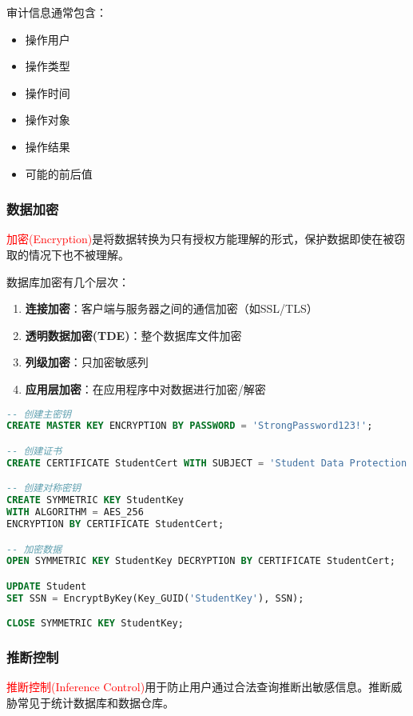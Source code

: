 \documentclass{../../note}
\begin{document}
审计信息通常包含：
\begin{itemize}
    \item 操作用户
    \item 操作类型
    \item 操作时间
    \item 操作对象
    \item 操作结果
    \item 可能的前后值
\end{itemize}

\subsubsection{数据加密}
\textcolor{red}{加密(Encryption)}是将数据转换为只有授权方能理解的形式，保护数据即使在被窃取的情况下也不被理解。

数据库加密有几个层次：
\begin{enumerate}
    \item \textbf{连接加密}：客户端与服务器之间的通信加密（如SSL/TLS）
    \item \textbf{透明数据加密(TDE)}：整个数据库文件加密
    \item \textbf{列级加密}：只加密敏感列
    \item \textbf{应用层加密}：在应用程序中对数据进行加密/解密
\end{enumerate}

\begin{lstlisting}[language=SQL, caption=SQL Server中的列加密示例]
-- 创建主密钥
CREATE MASTER KEY ENCRYPTION BY PASSWORD = 'StrongPassword123!';

-- 创建证书
CREATE CERTIFICATE StudentCert WITH SUBJECT = 'Student Data Protection';

-- 创建对称密钥
CREATE SYMMETRIC KEY StudentKey
WITH ALGORITHM = AES_256
ENCRYPTION BY CERTIFICATE StudentCert;

-- 加密数据
OPEN SYMMETRIC KEY StudentKey DECRYPTION BY CERTIFICATE StudentCert;

UPDATE Student
SET SSN = EncryptByKey(Key_GUID('StudentKey'), SSN);

CLOSE SYMMETRIC KEY StudentKey;
\end{lstlisting}

\subsubsection{推断控制}
\textcolor{red}{推断控制(Inference Control)}用于防止用户通过合法查询推断出敏感信息。推断威胁常见于统计数据库和数据仓库。
\end{document}
